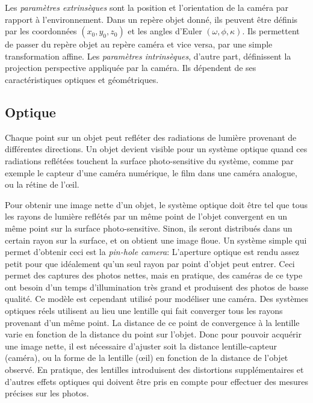 \documentclass[a4paper,10pt]{scrreprt}
\begin{document}
Les \emph{paramètres extrinsèques} sont la position et l'orientation de la caméra par rapport à l'environnement. Dans un repère objet donné, ils peuvent être définis par les coordonnées $(x_0, y_0, z_0)$ et les angles d'Euler $(\omega, \phi, \kappa)$. Ils permettent de passer du repère objet au repère caméra et vice versa, par une simple transformation affine. Les \emph{paramètres intrinsèques}, d'autre part, définissent la projection perspective appliquée par la caméra. Ils dépendent de ses caractéristiques optiques et géométriques. 

\subsection{Optique}
Chaque point sur un objet peut refléter des radiations de lumière provenant de différentes directions. Un objet devient visible pour un système optique quand ces radiations reflétées touchent la surface photo-sensitive du système, comme par exemple le capteur d'une caméra numérique, le film dans une caméra analogue, ou la rétine de l'œil.

Pour obtenir une image nette d'un objet, le système optique doit être tel que tous les rayons de lumière reflétés par un même point de l'objet convergent en un même point sur la surface photo-sensitive. Sinon, ils seront distribués dans un certain rayon sur la surface, et on obtient une image floue. Un système simple qui permet d'obtenir ceci est la \emph{pin-hole camera}: L'aperture optique est rendu assez petit pour que idéalement qu'un seul rayon par point d'objet peut entrer. Ceci permet des captures des photos nettes, mais en pratique, des caméras de ce type ont besoin d'un temps d'illumination très grand et produisent des photos de basse qualité. Ce modèle est cependant utilisé pour modéliser une caméra. Des systèmes optiques réels utilisent au lieu une lentille qui fait converger tous les rayons provenant d'un même point. La distance de ce point de convergence à la lentille varie en fonction de la distance du point sur l'objet. Donc pour pouvoir acquérir une image nette, il est nécessaire d'ajuster soit la distance lentille-capteur (caméra), ou la forme de la lentille (œil) en fonction de la distance de l'objet observé. En pratique, des lentilles introduisent des distortions supplémentaires et d'autres effets optiques qui doivent être pris en compte pour effectuer des mesures précises sur les photos. \cite{Truc1998}
\end{document}
